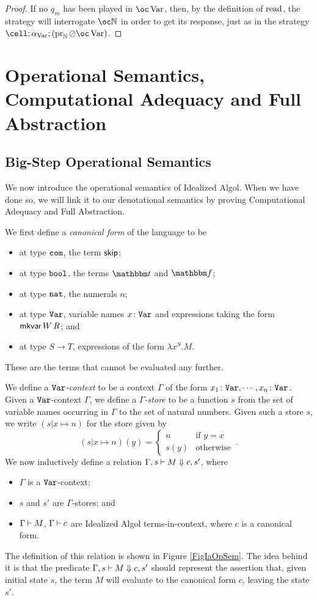 \begin{proof}
  If no $q_m$ has been played in $\oc\Varr$, then, by the definition of $\operatorname{read}$, the strategy will interrogate $\oc\bN$ in order to get its response, just as in the strategy $\cell;\alpha_{\Varr};(\pr_\bN\sequoid\oc\Varr)$.
\end{proof}

\chapter{Operational Semantics, Computational Adequacy and Full Abstraction}
\label{ChapFullAbstraction}

\section{Big-Step Operational Semantics}

We now introduce the operational semantics of Idealized Algol.  
When we have done so, we will link it to our denotational semantics by proving Computational Adequacy and Full Abstraction.

We first define a \emph{canonical form} of the language to be
\begin{itemize}
  \item at type ${\mathtt{com}}$, the term ${\mathsf{skip}}$;
  \item at type ${\mathtt{bool}}$, the terms $\true$ and $\false$;
  \item at type ${\mathtt{nat}}$, the numerals $n$; 
  \item at type ${\mathtt{Var}}$, variable names $x\colon{\mathtt{Var}}$ and expressions taking the form $\operatorname{{\mathsf{mkvar}}} W\,R$; and
  \item at type $S\to T$, expressions of the form $\lambda x^S.M$.
\end{itemize}
These are the terms that cannot be evaluated any further.

We define a \emph{${\mathtt{Var}}$-context} to be a context $\Gamma$ of the form $x_1\colon {\mathtt{Var}},\cdots,x_n\colon {\mathtt{Var}}$.
Given a ${\mathtt{Var}}$-context $\Gamma$, we define a \emph{$\Gamma$-store} to be a function $s$ from the set of variable names occurring in $\Gamma$ to the set of natural numbers.  
Given such a store $s$, we write $(s\vert x \mapsto n)$ for the store given by
\[
  (s\vert x\mapsto n)(y) = \begin{cases}
    n & \text{if $y = x$} \\
    s(y) & \text{otherwise}
  \end{cases}\,.
  \]
We now inductively define a relation $\Gamma,s\mathbin{\vdash} M\Downarrow c,s'$, where
\begin{itemize}
  \item $\Gamma$ is a ${\mathtt{Var}}$-context; 
  \item $s$ and $s'$ are $\Gamma$-stores;  and
  \item $\Gamma\mathbin{\vdash} M$, $\Gamma\mathbin{\vdash} c$ are Idealized Algol terms-in-context, where $c$ is a canonical form.
\end{itemize}
The definition of this relation is shown in Figure \ref{FigIaOpSem}.
The idea behind it is that the predicate $\Gamma,s\mathbin{\vdash} M\Downarrow c,s'$ should represent the assertion that, given initial state $s$, the term $M$ will evaluate to the canonical form $c$, leaving the state $s'$.

